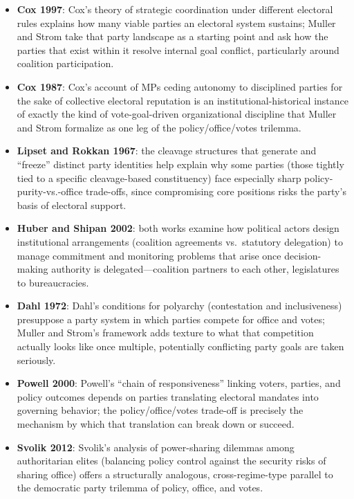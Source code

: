 \documentclass[12pt]{article}
\begin{document}
\begin{itemize}[leftmargin=*, itemsep=4pt]
    \item \textbf{Cox 1997}: Cox's theory of strategic coordination under different electoral rules explains how many viable parties an electoral system sustains; Muller and Strom take that party landscape as a starting point and ask how the parties that exist within it resolve internal goal conflict, particularly around coalition participation.
    \item \textbf{Cox 1987}: Cox's account of MPs ceding autonomy to disciplined parties for the sake of collective electoral reputation is an institutional-historical instance of exactly the kind of vote-goal-driven organizational discipline that Muller and Strom formalize as one leg of the policy/office/votes trilemma.
    \item \textbf{Lipset and Rokkan 1967}: the cleavage structures that generate and ``freeze'' distinct party identities help explain why some parties (those tightly tied to a specific cleavage-based constituency) face especially sharp policy-purity-vs.-office trade-offs, since compromising core positions risks the party's basis of electoral support.
    \item \textbf{Huber and Shipan 2002}: both works examine how political actors design institutional arrangements (coalition agreements vs.\ statutory delegation) to manage commitment and monitoring problems that arise once decision-making authority is delegated---coalition partners to each other, legislatures to bureaucracies.
    \item \textbf{Dahl 1972}: Dahl's conditions for polyarchy (contestation and inclusiveness) presuppose a party system in which parties compete for office and votes; Muller and Strom's framework adds texture to what that competition actually looks like once multiple, potentially conflicting party goals are taken seriously.
    \item \textbf{Powell 2000}: Powell's ``chain of responsiveness'' linking voters, parties, and policy outcomes depends on parties translating electoral mandates into governing behavior; the policy/office/votes trade-off is precisely the mechanism by which that translation can break down or succeed.
    \item \textbf{Svolik 2012}: Svolik's analysis of power-sharing dilemmas among authoritarian elites (balancing policy control against the security risks of sharing office) offers a structurally analogous, cross-regime-type parallel to the democratic party trilemma of policy, office, and votes.
\end{itemize}
\end{document}
